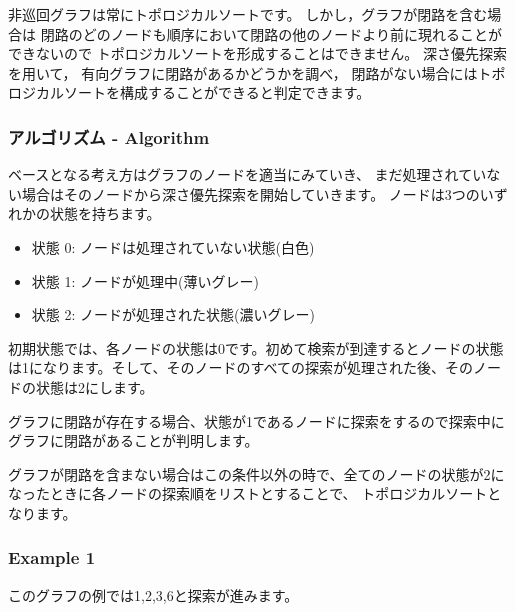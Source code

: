 非巡回グラフは常にトポロジカルソートです。
しかし，グラフが閉路を含む場合は
閉路のどのノードも順序において閉路の他のノードより前に現れることができないので
トポロジカルソートを形成することはできません。
深さ優先探索を用いて，
有向グラフに閉路があるかどうかを調べ，
閉路がない場合にはトポロジカルソートを構成することができると判定できます。

\subsubsection{アルゴリズム - Algorithm}

ベースとなる考え方はグラフのノードを適当にみていき、
まだ処理されていない場合はそのノードから深さ優先探索を開始していきます。
ノードは3つのいずれかの状態を持ちます。

\begin{itemize}
\item 状態 0: ノードは処理されていない状態(白色)
\item 状態 1: ノードが処理中(薄いグレー)
\item 状態 2: ノードが処理された状態(濃いグレー)
\end{itemize}

初期状態では、各ノードの状態は0です。初めて検索が到達するとノードの状態は1になります。そして、そのノードのすべての探索が処理された後、そのノードの状態は2にします。

グラフに閉路が存在する場合、状態が1であるノードに探索をするので探索中にグラフに閉路があることが判明します。

グラフが閉路を含まない場合はこの条件以外の時で、全てのノードの状態が2になったときに各ノードの探索順をリストとすることで、
トポロジカルソートとなります。

\subsubsection{Example 1}

このグラフの例では1,2,3,6と探索が進みます。

\begin{center}
\end{center}

